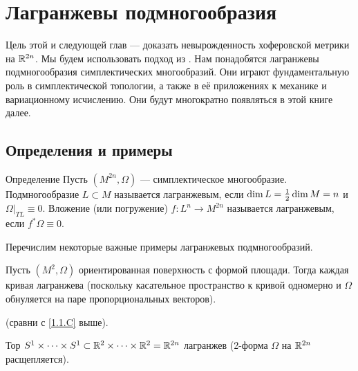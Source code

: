 \chapter{Лагранжевы подмногообразия}\label{chap:3}

Цель этой и следующей глав --- доказать невырожденность хоферовской метрики на $\mathbb{R}^{2n}$.
Мы будем использовать подход из \cite{P1}.
Нам понадобятся лагранжевы подмногообразия симплектических многообразий.
Они играют фундаментальную роль в симплектической топологии, а также в её приложениях к механике и вариационному исчислению.
Они будут многократно появляться в этой книге далее.

\section{Определения и примеры}\label{3.1}

\begin{thm*}{Определение}
Пусть $(M^{2n}, \Omega)$ --- симплектическое многообразие.
Подмногообразие $L \subset M$ называется лагранжевым, если $\dim L \z= \tfrac12 \dim M = n$ и $\Omega|_{TL} \equiv 0$.
Вложение (или погружение) $f\colon L^n \to M^{2n}$ называется лагранжевым, если $f^\ast \Omega \equiv 0$.
\end{thm*}

Перечислим некоторые важные примеры лагранжевых подмногообразий.

\begin{thm}{}\label{3.1.A} 
\end{thm}


Пусть $(M^2, \Omega)$ ориентированная поверхность с формой площади.
Тогда каждая кривая лагранжева (поскольку касательное пространство к кривой одномерно и $\Omega$ обнуляется на паре пропорциональных векторов).

\begin{thm}{}\label{3.1.B} (сравни с \ref{1.1.C} выше).
\end{thm}

Тор $S^1 \times\dots\times S^1
\subset 
\mathbb{R}^2\times\dots\times \mathbb{R}^2 
= 
\mathbb{R}^{2n}$ лагранжев (2-форма $\Omega$ на $\mathbb{R}^{2n}$ расщепляется).


\begin{thm}{}\label{3.1.C}
\end{thm}

